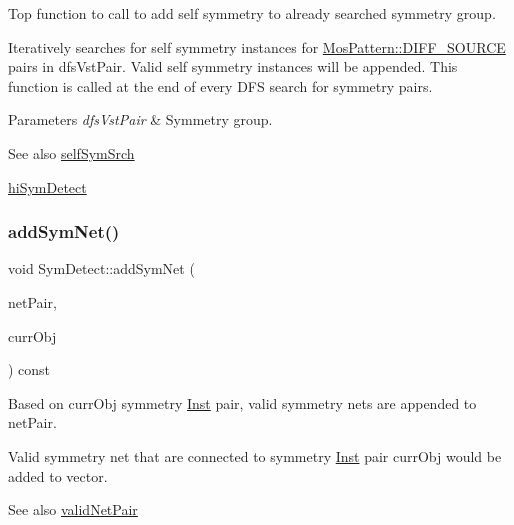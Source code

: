 Top function to call to add self symmetry to already searched symmetry group. 

Iteratively searches for self symmetry instances for \hyperlink{type_8h_af19eddb079bfea723256710b029c38e8ad45b64a7d6b85dde1b52dd5a18863933}{Mos\+Pattern\+::\+D\+I\+F\+F\+\_\+\+S\+O\+U\+R\+CE} pairs in dfs\+Vst\+Pair. Valid self symmetry instances will be appended. This function is called at the end of every D\+FS search for symmetry pairs.


\begin{DoxyParams}{Parameters}
{\em dfs\+Vst\+Pair} & Symmetry group.\\
\hline
\end{DoxyParams}
\begin{DoxySeeAlso}{See also}
\hyperlink{classSymDetect_ab6f286024b013fa257295111016da18b}{self\+Sym\+Srch} 

\hyperlink{classSymDetect_a81ec317ab0f508b3e0af483ef8a2c1ac}{hi\+Sym\+Detect} 
\end{DoxySeeAlso}
\mbox{\label{classSymDetect_a3d47390c92f0bd31d1ab84f1a62d66e3}} 
\subsubsection{\texorpdfstring{add\+Sym\+Net()}{addSymNet()}}
{\footnotesize\ttfamily void Sym\+Detect\+::add\+Sym\+Net (\begin{DoxyParamCaption}\item[{std\+::vector$<$ \hyperlink{classNetPair}{Net\+Pair} $>$ \&}]{net\+Pair,  }\item[{\hyperlink{classMosPair}{Mos\+Pair} \&}]{curr\+Obj }\end{DoxyParamCaption}) const\hspace{0.3cm}{\ttfamily [private]}}



Based on curr\+Obj symmetry \hyperlink{classInst}{Inst} pair, valid symmetry nets are appended to net\+Pair. 

Valid symmetry net that are connected to symmetry \hyperlink{classInst}{Inst} pair curr\+Obj would be added to vector.

\begin{DoxySeeAlso}{See also}
\hyperlink{classSymDetect_a455e5f585e60c484e2d093a44775faf5}{valid\+Net\+Pair} 
\end{DoxySeeAlso}

